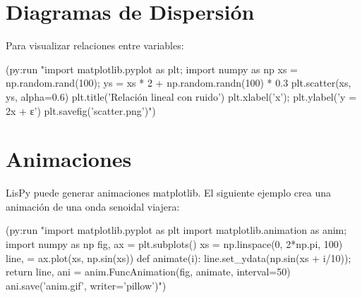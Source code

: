 \begin{center}
\end{center}

\section{Diagramas de Dispersión}

Para visualizar relaciones entre variables:

\begin{lispcode}
(py:run "import matplotlib.pyplot as plt; import numpy as np
xs = np.random.rand(100); ys = xs * 2 + np.random.randn(100) * 0.3
plt.scatter(xs, ys, alpha=0.6)
plt.title('Relación lineal con ruido')
plt.xlabel('x'); plt.ylabel('y = 2x + ε')
plt.savefig('scatter.png')")
\end{lispcode}

\begin{center}
\end{center}

\section{Animaciones}

LisPy puede generar animaciones matplotlib. El siguiente ejemplo crea una
animación de una onda senoidal viajera:

\begin{lispcode}
(py:run "import matplotlib.pyplot as plt
import matplotlib.animation as anim; import numpy as np
fig, ax = plt.subplots()
xs = np.linspace(0, 2*np.pi, 100)
line, = ax.plot(xs, np.sin(xs))
def animate(i): line.set_ydata(np.sin(xs + i/10)); return line,
ani = anim.FuncAnimation(fig, animate, interval=50)
ani.save('anim.gif', writer='pillow')")
\end{lispcode}

